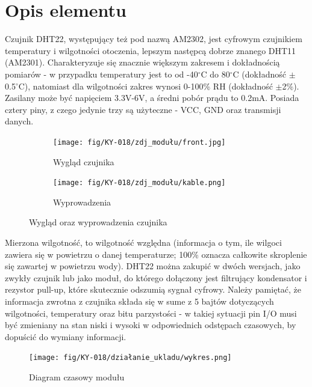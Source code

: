 \documentclass[11pt, a4paper]{article}
\author{Dawid Wasung}
\institute{Instytut Robotyki i Inteligencji Maszynowej}
\begin{document}
\newpage

\section*{Opis elementu} 
Czujnik DHT22, występujący też pod nazwą AM2302, jest cyfrowym czujnikiem temperatury i wilgotności otoczenia, lepszym następcą dobrze znanego DHT11 (AM2301). Charakteryzuje się znacznie większym zakresem i dokładnością pomiarów - w przypadku temperatury jest to od -40$^{\circ}$C do 80$^{\circ}$C (dokładność $\pm$ 0.5$^{\circ}$C), natomiast dla wilgotności zakres wynosi 0-100\% RH (dokładność $\pm$2\%). Zasilany może być napięciem 3.3V-6V, a średni pobór prądu to 0.2mA. Posiada cztery piny, z czego jedynie trzy są użyteczne - VCC, GND oraz transmisji danych. 
\vspace{0.5cm}
\begin{figure}[h!]
\centering
\begin{subfigure}{.5\textwidth}
  \centering
  \texttt{[image: fig/KY-018/zdj\_modułu/front.jpg]}
  \caption{Wygląd czujnika}
  \label{fig:sub1}
\end{subfigure}%
\begin{subfigure}{.5\textwidth}
  \centering
  \texttt{[image: fig/KY-018/zdj\_modułu/kable.png]}
  \caption{Wyprowadzenia}
\end{subfigure}
\caption{Wygląd oraz wyprowadzenia czujnika}
\label{fig:test}
\end{figure}

Mierzona wilgotność, to wilgotność względna (informacja o tym, ile wilgoci zawiera się w powietrzu o danej temperaturze; 100\% oznacza całkowite skroplenie się zawartej w powietrzu wody). DHT22 można zakupić w dwóch wersjach, jako zwykły czujnik lub jako moduł, do którego dołączony jest filtrujący kondensator i rezystor pull-up, które skutecznie odszumią sygnał cyfrowy. Należy pamiętać, że informacja zwrotna z czujnika składa się w sume z 5 bajtów dotyczących wilgotności, temperatury oraz bitu parzystości - w takiej sytuacji pin I\slash O musi być zmieniany na stan niski i wysoki w odpowiednich odstępach czasowych, by dopuścić do wymiany informacji.

\begin{figure}[h!]
\centering
\texttt{[image: fig/KY-018/działanie\_ukladu/wykres.png]}
\caption{Diagram czasowy modułu \cite{DHT:wykres}}
\label{fig:sub2}
\end{figure}
\end{document}
